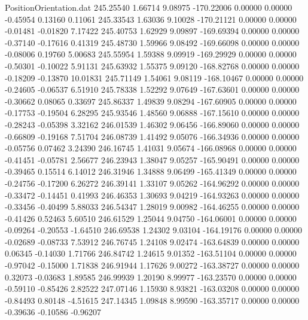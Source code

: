 \begin{filecontents}{PositionOrientation.dat}
 245.25540    1.66714    9.08975  -170.22006    0.00000    0.00000   -0.45954    0.13160    0.11061
 245.33543    1.63036    9.10028  -170.21121    0.00000    0.00000   -0.01481   -0.01820    7.17422
 245.40753    1.62929    9.09897  -169.69394    0.00000    0.00000   -0.37140   -0.17616    0.41319
 245.48730    1.59966    9.08492  -169.66098    0.00000    0.00000   -0.08006    0.19760    5.00683
 245.55954    1.59388    9.09919  -169.29929    0.00000    0.00000   -0.50301   -0.10022    5.91131
 245.63932    1.55375    9.09120  -168.82768    0.00000    0.00000   -0.18209   -0.13870   10.01831
 245.71149    1.54061    9.08119  -168.10467    0.00000    0.00000   -0.24605   -0.06537    6.51910
 245.78338    1.52292    9.07649  -167.63601    0.00000    0.00000   -0.30662    0.08065    0.33697
 245.86337    1.49839    9.08294  -167.60905    0.00000    0.00000   -0.17753   -0.19504    6.28295
 245.93546    1.48560    9.06888  -167.15610    0.00000    0.00000   -0.28243   -0.05398    3.32162
 246.01539    1.46302    9.06456  -166.89060    0.00000    0.00000   -0.66809   -0.19168    7.51704
 246.08739    1.41492    9.05076  -166.34936    0.00000    0.00000   -0.05756    0.07462    3.24390
 246.16745    1.41031    9.05674  -166.08968    0.00000    0.00000   -0.41451   -0.05781    2.56677
 246.23943    1.38047    9.05257  -165.90491    0.00000    0.00000   -0.39465    0.15514    6.14012
 246.31946    1.34888    9.06499  -165.41349    0.00000    0.00000   -0.24756   -0.17200    6.26272
 246.39141    1.33107    9.05262  -164.96292    0.00000    0.00000   -0.33472   -0.14451    0.41993
 246.46353    1.30693    9.04219  -164.93263    0.00000    0.00000   -0.33456   -0.40499    5.88033
 246.54347    1.28019    9.00982  -164.46255    0.00000    0.00000   -0.41426    0.52463    5.60510
 246.61529    1.25044    9.04750  -164.06001    0.00000    0.00000   -0.09264   -0.20553   -1.64510
 246.69538    1.24302    9.03104  -164.19176    0.00000    0.00000   -0.02689   -0.08733    7.53912
 246.76745    1.24108    9.02474  -163.64839    0.00000    0.00000    0.06345   -0.14030    1.71766
 246.84742    1.24615    9.01352  -163.51104    0.00000    0.00000   -0.97042   -0.15000    1.71838
 246.91944    1.17626    9.00272  -163.38727    0.00000    0.00000    0.32073   -0.03683    1.89585
 246.99939    1.20190    8.99977  -163.23570    0.00000    0.00000   -0.59110   -0.85426    2.82522
 247.07146    1.15930    8.93821  -163.03208    0.00000    0.00000   -0.84493    0.80148   -4.51615
 247.14345    1.09848    8.99590  -163.35717    0.00000    0.00000   -0.39636   -0.10586   -0.96207

\end{filecontents}
